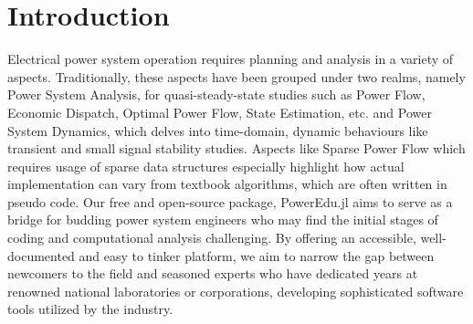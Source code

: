 \documentclass[varwidth]{standalone}
\providecommand{\packageName}[1]{PowerEdu.jl}
\begin{document}
    \section{Introduction}
    Electrical power system operation requires planning and analysis in a variety
    of aspects. Traditionally, these aspects have been grouped under two realms,
    namely Power System Analysis, for quasi-steady-state studies
    such as Power Flow, Economic Dispatch, Optimal Power Flow, State Estimation, etc.
    and Power System Dynamics, which delves into time-domain, dynamic behaviours
    like transient and small signal stability studies. Aspects like Sparse Power
    Flow which requires usage of sparse data
    structures especially highlight how actual implementation can vary from
    textbook algorithms, which are often written in pseudo code.
    Our free and open-source package, \packageName{} aims to serve as a bridge for budding power system engineers who
    may find the initial stages of coding and computational analysis challenging.
    By offering an accessible, well-documented and easy to tinker platform, we
    aim to narrow the gap between newcomers to the field and seasoned experts
    who have dedicated years at renowned national laboratories or corporations,
    developing sophisticated software tools utilized
    by the industry.
\end{document}
